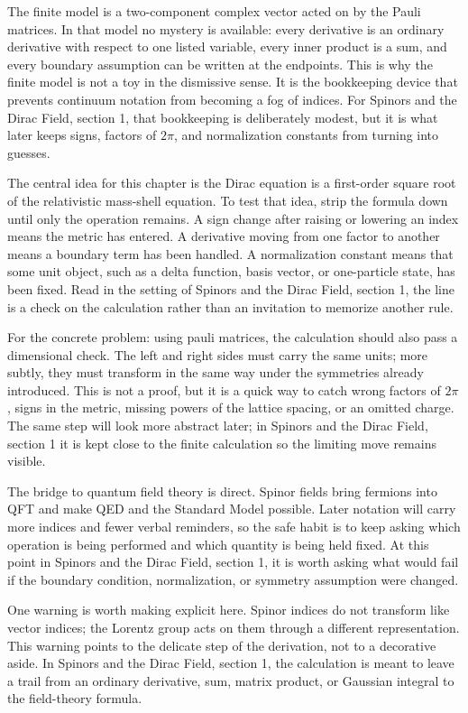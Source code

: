 The finite model is a two-component complex vector acted on by the Pauli matrices.  In that model no mystery is available: every derivative is an ordinary derivative with respect to one listed variable, every inner product is a sum, and every boundary assumption can be written at the endpoints.  This is why the finite model is not a toy in the dismissive sense.  It is the bookkeeping device that prevents continuum notation from becoming a fog of indices.  For Spinors and the Dirac Field, section 1, that bookkeeping is deliberately modest, but it is what later keeps signs, factors of \(2\pi\), and normalization constants from turning into guesses.

The central idea for this chapter is the Dirac equation is a first-order square root of the relativistic mass-shell equation.  To test that idea, strip the formula down until only the operation remains.  A sign change after raising or lowering an index means the metric has entered.  A derivative moving from one factor to another means a boundary term has been handled.  A normalization constant means that some unit object, such as a delta function, basis vector, or one-particle state, has been fixed.  Read in the setting of Spinors and the Dirac Field, section 1, the line is a check on the calculation rather than an invitation to memorize another rule.

For the concrete problem: using pauli matrices, the calculation should also pass a dimensional check.  The left and right sides must carry the same units; more subtly, they must transform in the same way under the symmetries already introduced.  This is not a proof, but it is a quick way to catch wrong factors of \(2\pi\), signs in the metric, missing powers of the lattice spacing, or an omitted charge.  The same step will look more abstract later; in Spinors and the Dirac Field, section 1 it is kept close to the finite calculation so the limiting move remains visible.

The bridge to quantum field theory is direct.  Spinor fields bring fermions into QFT and make QED and the Standard Model possible.  Later notation will carry more indices and fewer verbal reminders, so the safe habit is to keep asking which operation is being performed and which quantity is being held fixed.  At this point in Spinors and the Dirac Field, section 1, it is worth asking what would fail if the boundary condition, normalization, or symmetry assumption were changed.

One warning is worth making explicit here.  Spinor indices do not transform like vector indices; the Lorentz group acts on them through a different representation.  This warning points to the delicate step of the derivation, not to a decorative aside.  In Spinors and the Dirac Field, section 1, the calculation is meant to leave a trail from an ordinary derivative, sum, matrix product, or Gaussian integral to the field-theory formula.

